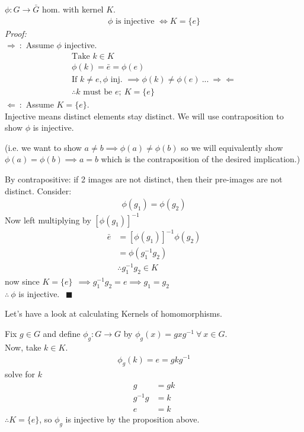 \begin{proposition}
$\phi:G\rightarrow \bar{G}$ hom. with kernel $K$.
\begin{align}
    \phi \text{ is injective } \iff K= \{e\}\nonumber
\end{align}
\textit{Proof:}\\
$\Rightarrow \ :$ Assume $\phi$ injective.\\
\begin{align}
    \text{Take }k\in K \nonumber \\
    \phi(k)=\bar{e}=\phi(e) \nonumber \\
    \text{If }k\neq e , \phi \text{ inj. } \implies \phi(k)\neq \phi(e)\ ...\ \Rightarrow \Leftarrow \nonumber \\
    \therefore k \text{ must be }e; \ K=\{e\} \nonumber
\end{align}
$\Leftarrow \ :$ Assume $K=\{e\}$.\\
Injective means distinct elements stay distinct. We will use contraposition to show $\phi$ is
injective.
\steezybreak %

(i.e. we want to show $a\neq b \implies \phi(a)\neq \phi(b)$ so we will equivalently show
$\phi(a)=\phi(b) \implies a= b$ which is the contraposition of the desired implication.)\steezybreak

\noindent By contrapositive: if 2 images are not distinct, then their pre-images are not distinct.
Consider:
\begin{align}
    \phi(g_1)=\phi(g_2)\nonumber
\end{align}
Now left multiplying by $[\phi(g_1)]^{-1}$
\begin{align}
    \bar{e}&=[\phi(g_1)]^{-1}\phi(g_2)\nonumber \\
    &= \phi(g_1^{-1}g_2) \nonumber \\
    &\therefore g_1^{-1}g_2\in K \nonumber
\end{align}
now since $K=\{e\}\ \ \implies g_1^{-1}g_2=e \implies g_1=g_2$\\
$\therefore \ \phi$ is injective. $\ \ \blacksquare$
\end{proposition}

Let's have a look at calculating Kernels of homomorphisms.
\begin{example}
Fix $g\in G$ and define $\phi_g: G\rightarrow G$ by $\phi_g(x)=gxg^{-1}\ \forall \  x \in G$. \\
Now, take $k\in K$.
\begin{align}
    \phi_g(k)=e=gkg^{-1} \nonumber
\end{align}
solve for $k$
\begin{align}
    g&=gk\nonumber \\
    g^{-1}g&=k\nonumber \\
    e&=k\nonumber
\end{align}
$\therefore K = \{e\}$, so $\phi_g$ is injective by the proposition above.
\end{example}

